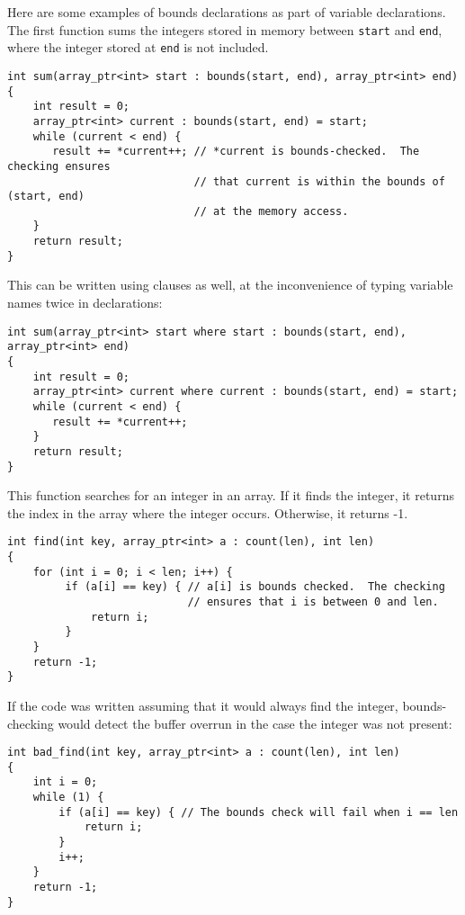Here are some examples of bounds declarations as part of variable
declarations. The first function sums the integers stored in memory
between \texttt{start} and \texttt{end}, where the integer stored at
\texttt{end} is not included.

\begin{verbatim}
int sum(array_ptr<int> start : bounds(start, end), array_ptr<int> end)
{ 
    int result = 0;
    array_ptr<int> current : bounds(start, end) = start;
    while (current < end) {
       result += *current++; // *current is bounds-checked.  The checking ensures 
                             // that current is within the bounds of (start, end) 
                             // at the memory access.                           
    }
    return result;
}
\end{verbatim}

This can be written using  clauses as well, at the
inconvenience of typing variable names twice in declarations:

\begin{verbatim}
int sum(array_ptr<int> start where start : bounds(start, end), array_ptr<int> end)
{ 
    int result = 0;
    array_ptr<int> current where current : bounds(start, end) = start;
    while (current < end) {
       result += *current++;                          
    }
    return result;
}
\end{verbatim}

This function searches for an integer in an array. If it finds the
integer, it returns the index in the array where the integer occurs.
Otherwise, it returns -1.

\begin{verbatim}
int find(int key, array_ptr<int> a : count(len), int len)
{
    for (int i = 0; i < len; i++) {
         if (a[i] == key) { // a[i] is bounds checked.  The checking
                            // ensures that i is between 0 and len.
             return i;
         }
    }
    return -1;
}
\end{verbatim}

If the code was written assuming that it would always find the integer,
bounds-checking would detect the buffer overrun in the case the integer
was not present:

\begin{verbatim}
int bad_find(int key, array_ptr<int> a : count(len), int len)
{
    int i = 0;
    while (1) {
        if (a[i] == key) { // The bounds check will fail when i == len
            return i;
        }
        i++;
    }
    return -1;
}

\end{verbatim}


